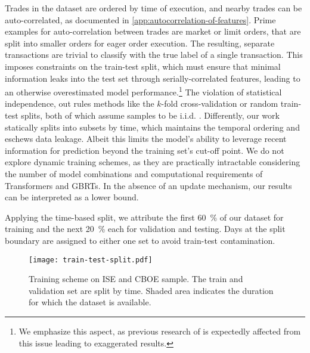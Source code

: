 Trades in the dataset are ordered by time of execution, and nearby trades can be auto-correlated, as documented in \cref{app:autocorrelation-of-features}.
Prime examples for auto-correlation between trades are market or limit orders, that are split into smaller orders for eager order execution. %
The resulting, separate transactions are trivial to classify with the true label of a single transaction. This imposes constraints on the train-test split, which must ensure that minimal information leaks into the test set through serially-correlated features, leading to an otherwise overestimated model performance.\footnote{We emphasize this aspect, as previous research of \textcite[][14]{ronenMachineLearningTrade2022} is expectedly affected from this issue leading to exaggerated results.} The violation of statistical independence, out rules methods like the $k$-fold cross-validation or random train-test splits, both of which assume samples to be i.i.d. \autocite[][103--105]{lopezdepradoAdvancesFinancialMachine2018}. Differently, our work statically splits into subsets by time, which maintains the temporal ordering and eschews data leakage. Albeit this limits the model's ability to leverage recent information for prediction beyond the training set's cut-off point. We do not explore dynamic training schemes, as they are practically intractable considering the number of model combinations and computational requirements of Transformers and \glspl{GBRT}. In the absence of an update mechanism, our results can be interpreted as a lower bound.

Applying the time-based split, we attribute the first \SI{60}{\percent} of our dataset for training and the next \SI{20}{\percent} each for validation and testing. Days at the split boundary are assigned to either one set to avoid train-test contamination. %

\begin{figure}[ht]
    \centering
    \texttt{[image: train-test-split.pdf]}
    \caption[Training Scheme on  and  Sample]{Training scheme on \gls{ISE} and \gls{CBOE} sample. The train and validation set are split by time. Shaded area  indicates the duration for which the dataset is available.}
    \label{fig:train-test-split}
\end{figure}

